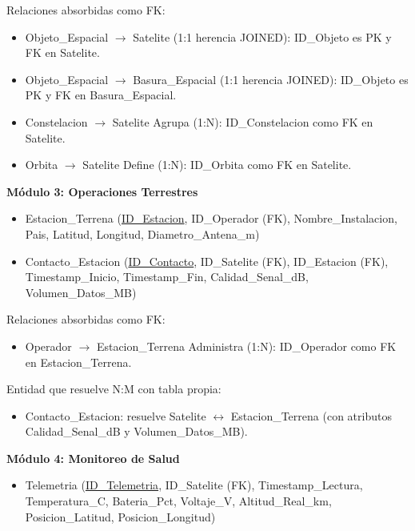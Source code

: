 Relaciones absorbidas como FK:
\begin{itemize}
    \item Objeto\_Espacial $\rightarrow$ Satelite (1:1 herencia JOINED): ID\_Objeto es PK y FK en Satelite.
    \item Objeto\_Espacial $\rightarrow$ Basura\_Espacial (1:1 herencia JOINED): ID\_Objeto es PK y FK en Basura\_Espacial.
    \item Constelacion $\rightarrow$ Satelite Agrupa (1:N): ID\_Constelacion como FK en Satelite.
    \item Orbita $\rightarrow$ Satelite Define (1:N): ID\_Orbita como FK en Satelite.
\end{itemize}

\vspace{0.5cm}
\noindent \textbf{Módulo 3: Operaciones Terrestres}

\begin{itemize}
    \item Estacion\_Terrena (\underline{ID\_Estacion}, ID\_Operador (FK), Nombre\_Instalacion, Pais, Latitud, Longitud, Diametro\_Antena\_m)
    \item Contacto\_Estacion (\underline{ID\_Contacto}, ID\_Satelite (FK), ID\_Estacion (FK), Timestamp\_Inicio, Timestamp\_Fin, Calidad\_Senal\_dB, Volumen\_Datos\_MB)
\end{itemize}

Relaciones absorbidas como FK:
\begin{itemize}
    \item Operador $\rightarrow$ Estacion\_Terrena Administra (1:N): ID\_Operador como FK en Estacion\_Terrena.
\end{itemize}

Entidad que resuelve N:M con tabla propia:
\begin{itemize}
    \item Contacto\_Estacion: resuelve Satelite $\leftrightarrow$ Estacion\_Terrena (con atributos Calidad\_Senal\_dB y Volumen\_Datos\_MB).
\end{itemize}

\vspace{0.5cm}
\noindent \textbf{Módulo 4: Monitoreo de Salud}

\begin{itemize}
    \item Telemetria (\underline{ID\_Telemetria}, ID\_Satelite (FK), Timestamp\_Lectura, Temperatura\_C, Bateria\_Pct, Voltaje\_V, Altitud\_Real\_km, Posicion\_Latitud, Posicion\_Longitud)
\end{itemize}

